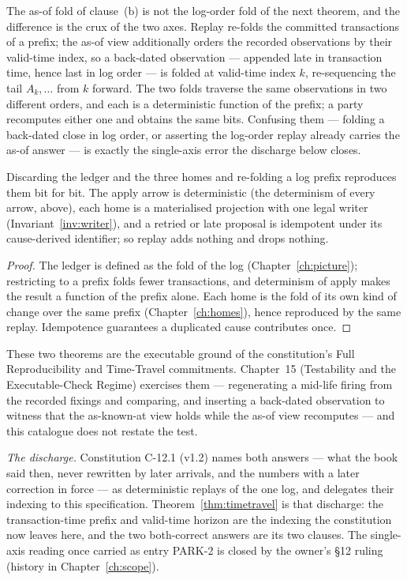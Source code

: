 The as-of fold of clause~(b) is not the log-order fold of the next theorem, and the
difference is the crux of the two axes. Replay re-folds the committed transactions of a
prefix; the as-of view additionally orders the recorded observations by their valid-time
index, so a back-dated observation --- appended late in transaction time, hence last in
log order --- is folded at valid-time index $k$, re-sequencing the tail $A_k,\dots$ from $k$
forward. The two folds traverse the same observations in two different orders, and each is
a deterministic function of the prefix; a party recomputes either one and obtains the same
bits. Confusing them --- folding a back-dated close in log order, or asserting the log-order
replay already carries the as-of answer --- is exactly the single-axis error the discharge
below closes.

\begin{theorem}\label{thm:replay}
Discarding the ledger and the three homes and re-folding a log prefix reproduces
them bit for bit. The apply arrow is deterministic (the determinism of every
arrow, above), each home is a materialised projection with one legal writer
(Invariant~\ref{inv:writer}), and a retried or late proposal is
idempotent under its cause-derived identifier; so replay adds nothing and drops
nothing.
\end{theorem}

\begin{proof}
The ledger is defined as the fold of the log (Chapter~\ref{ch:picture});
restricting to a prefix folds fewer transactions, and determinism of apply makes
the result a function of the prefix alone. Each home is the fold of its own kind
of change over the same prefix (Chapter~\ref{ch:homes}), hence reproduced by the
same replay. Idempotence guarantees a duplicated cause contributes once.
\end{proof}

These two theorems are the executable ground of the constitution's Full
Reproducibility and Time-Travel commitments. Chapter~15 (Testability and the
Executable-Check Regime) exercises them --- regenerating a mid-life firing from
the recorded fixings and comparing, and inserting a back-dated observation to
witness that the as-known-at view holds while the as-of view recomputes --- and
this catalogue does not restate the test.

\emph{The discharge.} Constitution C-12.1 (v1.2) names both answers --- what the book said
then, never rewritten by later arrivals, and the numbers with a later correction in force ---
as deterministic replays of the one log, and delegates their indexing to this specification.
Theorem~\ref{thm:timetravel} is that discharge: the transaction-time prefix and valid-time
horizon are the indexing the constitution now leaves here, and the two both-correct answers
are its two clauses. The single-axis reading once carried as entry PARK-2 is closed by the
owner's \S 12 ruling (history in Chapter~\ref{ch:scope}).

